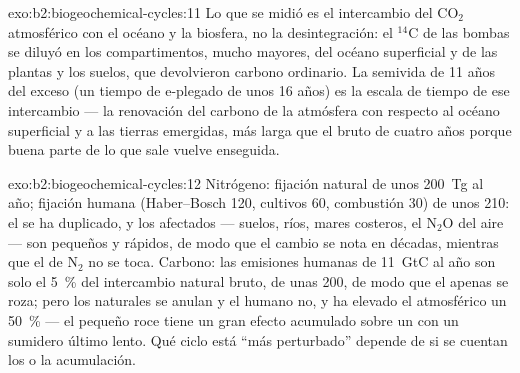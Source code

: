 \begin{solution}{exo:b2:biogeochemical-cycles:11}
Lo que se midió es el intercambio del $\mathrm{CO_2}$ atmosférico con el
océano y la biosfera, no la desintegración: el $\mathrm{{}^{14}C}$ de las bombas se
diluyó en los compartimentos, mucho mayores, del océano superficial y de
las plantas y los suelos, que devolvieron carbono ordinario. La semivida
de 11 años del exceso (un tiempo de e-plegado de unos 16 años) es la escala
de tiempo de ese intercambio --- la renovación del carbono de la atmósfera
con respecto al océano superficial y a las tierras emergidas, más larga que
el  bruto de cuatro años porque buena parte de lo que
sale vuelve enseguida.
\end{solution}

\begin{solution}{exo:b2:biogeochemical-cycles:12}
Nitrógeno: fijación natural de unos 200~Tg al año; fijación humana
(Haber--Bosch 120, cultivos 60, combustión 30) de unos 210: el  se ha
duplicado, y los  afectados --- suelos, ríos, mares costeros, el
$\mathrm{N_2O}$ del aire --- son pequeños y rápidos, de modo que el cambio
se nota en décadas, mientras que el  de $\mathrm{N_2}$ no se toca.
Carbono: las emisiones humanas de 11~GtC al año son solo el \qty{5}{\%} del
intercambio natural bruto, de unas 200, de modo que el  apenas se
roza; pero los  naturales se anulan y el humano no, y ha elevado el
 atmosférico un \qty{50}{\%} --- el pequeño roce tiene un gran
efecto acumulado sobre un  con un sumidero último lento. Qué
ciclo está ``más perturbado'' depende de si se cuentan los  o la
acumulación.
\end{solution}

